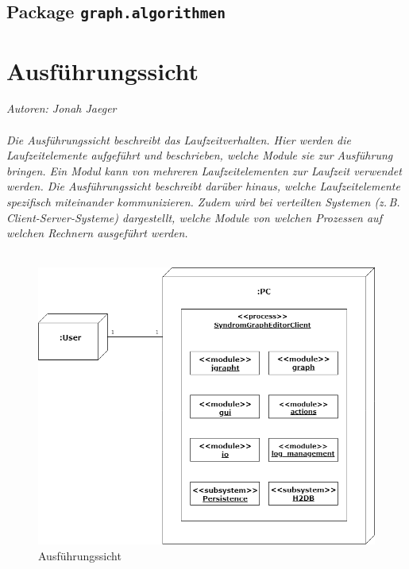 \documentclass[enabledeprecatedfontcommands,fontsize=11pt,paper=a4,twoside]{scrartcl}
\begin{document}
\subsection{Package \texttt{graph.algorithmen}}
















\newpage
\section{Ausführungssicht}
\label{sec:ausfuehrung}
\emph{Autoren: Jonah Jaeger}\\ \\
 
{\it
Die Ausführungssicht beschreibt das Laufzeitverhalten. Hier
werden die Laufzeitelemente aufgeführt und beschrieben, welche Module
sie zur Ausführung bringen. Ein Modul kann von mehreren
Laufzeitelementen zur Laufzeit verwendet werden. Die Ausführungssicht
beschreibt darüber hinaus, welche Laufzeitelemente spezifisch
miteinander kommunizieren. Zudem wird bei verteilten Systemen
(z.\,B. Client-Server-Systeme) dargestellt, welche Module von welchen
Prozessen auf welchen Rechnern ausgeführt werden.}\\ \\

\begin{figure}[ht]
	\centering
	\includegraphics[width=1\textwidth]{ausfuehrungssicht.png}
	\caption{Ausführungssicht}
\end{figure}
\end{document}
